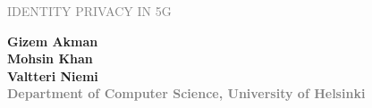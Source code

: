 \documentclass[portrait,a0]{a0poster}
\begin{document}
\begin{multicols}{2} 
\begin{minipage}[t]{1\linewidth}
\vspace{70pt}
\begin{flushleft}
\begin{spacing}{2.5}
{\Huge{}\textcolor{gray}{\MakeUppercase{Identity privacy in 5G}} \MakeUppercase{}} \\

\end{spacing}
\end{flushleft}
\end{minipage}

\begin{minipage}[t]{.95\linewidth} %
\vspace{0pt} %
\begin{flushright}
\textsf{\bfseries
Gizem Akman \\
Mohsin Khan \\
Valtteri Niemi\\
} %
\textcolor{gray}{\textsf{\bfseries{Department of Computer Science, University of Helsinki}}}
\end{flushright}
\end{minipage}
\end{multicols}


\noindent\makebox[\linewidth]{\rule{\paperwidth}{3pt}}
\end{document}
